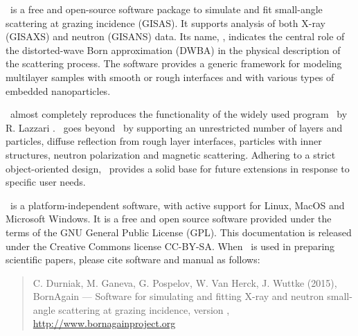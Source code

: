 

\newpage
{}


\BornAgain\ is a free and open-source software package
to simulate and fit small-angle
scattering at grazing incidence (GISAS). 
It supports analysis of both  X-ray (GISAXS) and neutron (GISANS) data.
Its name, \BornAgain, indicates the central role of the distorted-wave Born
approximation (DWBA) in the physical description of the
scattering process. The software provides a generic framework for modeling multilayer samples with smooth or
rough interfaces and with various types of embedded nano\-particles.

\BornAgain\ almost completely reproduces the functionality
of the widely used program \IsGISAXS\
by R. Lazzari \cite{Laz02}.
\BornAgain\ goes beyond \IsGISAXS\ by
supporting an unrestricted number of layers and particles, 
diffuse reflection from rough layer interfaces,
particles with inner structures, neutron polarization and magnetic scattering.
Adhering to a strict object-oriented design,
\BornAgain\ provides a solid base for future extensions
in response to specific user needs.

\BornAgain\ is a platform-independent software,
with active support for Linux, MacOS and 
Microsoft Windows. 
It is a free and open source software provided under the terms
of the GNU General Public License (GPL).
This documentation is released under the Creative Commons license CC-BY-SA.
When \BornAgain\ is used in preparing scientific papers,
please cite software and manual as follows: 
\begin{quote}
C. Durniak, M. Ganeva, G. Pospelov, W. Van Herck, J. Wuttke (2015),\newline
BornAgain --- Software for simulating and fitting
X-ray and neutron small-angle scattering at grazing incidence,
version \UserManualVersionNumber,\newline
\url{http://www.bornagainproject.org}
\end{quote}

